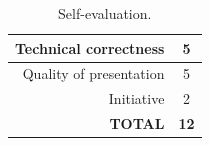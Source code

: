 \documentclass[12pt,a4paper]{article}
\begin{document}
\clearpage
\begin{table}[!htb]
	\centering
	\caption{Self-evaluation.}
	\begin{tabular}{||r|c||}
		\hline
		Technical correctness & 5 \\ \hline
		Quality of presentation & 5 \\ \hline
		Initiative & 2 \\ \hline
		\textbf{TOTAL} & \textbf{12} \\ \hline
	\end{tabular}
	\label{tab:self-eval}
\end{table}



\end{document}
